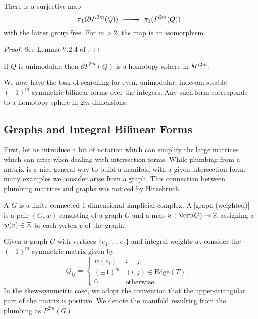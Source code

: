 \begin{proposition}\label{prop:fundamental-group-plumbing}
	There is a surjective map
	\[\pi_1(\partial P^{2m}(Q))\lkxsurj \pi_1(P^{2m}(Q))\]
	with the latter group free. For $m>2$, the map is an isomorphism.
\end{proposition}
\begin{proof}
	See Lemma V.2.4 of \cite{browder1972surgery}.
\end{proof}

\begin{theorem}
	If $Q$ is unimodular, then $\partial P^{2m}(Q)$ is a homotopy sphere in $bP^{2m}$.
\end{theorem}

We now have the task of searching for even, unimodular, indecomposable $(-1)^m$-symmetric bilinear forms over the integers. Any such form corresponds to a homotopy sphere in $2m$ dimensions.

\subsection{Graphs and Integral Bilinear Forms}
First, let us introduce a bit of notation which can simplify the large matrices which can arise when dealing with intersection forms. While plumbing from a matrix is a nice general way to build a manifold with a given intersection form, many examples we consider arise from a graph. This connection between plumbing matrices and graphs was noticed by Hirzebruch.

\begin{definition}
	A  $G$ is a finite connected $1$-dimensional simplicial complex.
	A [graph (weighted)] is a pair $(G,w)$ consisting of a graph $G$ and a map $w : \operatorname{Vert}(G) \to \mathbb{Z}$ assigning a  $w(v)\in \mathbb{Z}$ to each vertex $v$ of the graph.
\end{definition}

Given a graph $G$ with vertices $\{e_1,\ldots, e_\ell\}$ and integral weights $w$, consider the $(-1)^m$-symmetric matrix given by
\[
	Q_{ij} = \begin{cases}
		w(e_i)    & i=j,                       \\
		(\pm 1)^m & (i,j)\in \textrm{Edge}(T), \\
		0         & \textrm{otherwise}.
	\end{cases}
\]
In the skew-symmetric case, we adopt the convention that the upper-triangular part of the matrix is positive. We denote the manifold resulting from the plumbing as $P^{2m}(G)$.

